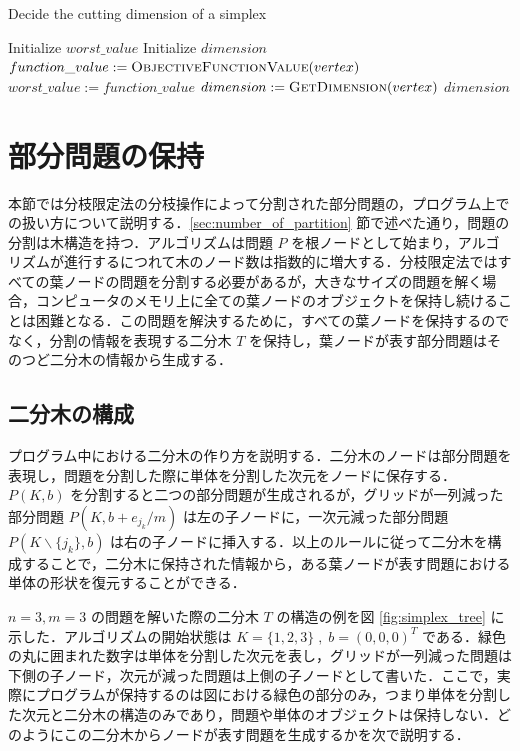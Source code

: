 \documentclass[a4paper,11pt]{jreport}
\begin{document}
\begin{algorithm}
\caption{Decide the cutting dimension of a simplex}
\label{algo:cutting_dimension}
\begin{algorithmic}[1]
\State Initialize $ worst\_value $
\State Initialize $ dimension $
\State $ function\_value := \Call{ObjectiveFunctionValue}{vertex} $
\State $ worst\_value := function\_value $
\State $ dimension := \Call{GetDimension}{vertex} $
\EndIf
\EndFor
\State \Return $ dimension $
\EndFunction
\end{algorithmic}
\end{algorithm}

\section{部分問題の保持}

本節では分枝限定法の分枝操作によって分割された部分問題の，プログラム上での扱い方について説明する．\ref{sec:number_of_partition} 節で述べた通り，問題の分割は木構造を持つ．アルゴリズムは問題 $ P $ を根ノードとして始まり，アルゴリズムが進行するにつれて木のノード数は指数的に増大する．分枝限定法ではすべての葉ノードの問題を分割する必要があるが，大きなサイズの問題を解く場合，コンピュータのメモリ上に全ての葉ノードのオブジェクトを保持し続けることは困難となる．この問題を解決するために，すべての葉ノードを保持するのでなく，分割の情報を表現する二分木 $ T $ を保持し，葉ノードが表す部分問題はそのつど二分木の情報から生成する．\par

\subsection{二分木の構成}

プログラム中における二分木の作り方を説明する．二分木のノードは部分問題を表現し，問題を分割した際に単体を分割した次元をノードに保存する．$ P(K, b) $ を分割すると二つの部分問題が生成されるが，グリッドが一列減った部分問題 $ P(K, b + e_{j_k} / m) $ は左の子ノードに，一次元減った部分問題 $ P(K \backslash \{ j_k \}, b) $ は右の子ノードに挿入する．以上のルールに従って二分木を構成することで，二分木に保持された情報から，ある葉ノードが表す問題における単体の形状を復元することができる．\par
$ n = 3, m = 3 $ の問題を解いた際の二分木 $ T $ の構造の例を図 \ref{fig:simplex_tree} に示した．アルゴリズムの開始状態は $ K = \{1, 2, 3\} \; , \; b = (0, 0, 0)^T $ である．緑色の丸に囲まれた数字は単体を分割した次元を表し，グリッドが一列減った問題は下側の子ノード，次元が減った問題は上側の子ノードとして書いた．ここで，実際にプログラムが保持するのは図における緑色の部分のみ，つまり単体を分割した次元と二分木の構造のみであり，問題や単体のオブジェクトは保持しない．どのようにこの二分木からノードが表す問題を生成するかを次で説明する．\par
\end{document}
